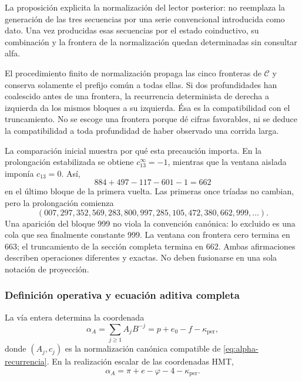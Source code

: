 La proposición explicita la normalización del lector posterior: no
reemplaza la generación de las tres secuencias por una serie convencional
introducida como dato. Una vez producidas esas secuencias por el estado
coinductivo, su combinación y la frontera de la normalización quedan
determinadas sin consultar alfa.

El procedimiento finito de normalización propaga las cinco
fronteras de \(\mathcal C\) y conserva solamente el prefijo común a
todas ellas. Si dos profundidades han coalescido antes de una frontera,
la recurrencia determinista de derecha a izquierda da los mismos bloques
a su izquierda. Ésa es la compatibilidad con el truncamiento. No se
escoge una frontera porque dé cifras favorables, ni se deduce la
compatibilidad a toda profundidad de haber observado una corrida larga.

La comparación inicial muestra por qué esta precaución importa. En la
prolongación estabilizada se obtiene \(c_{13}^{\infty}=-1\), mientras
que la ventana aislada imponía \(c_{13}=0\). Así,
\[
 884+497-117-601-1=662
\]
en el último bloque de la primera vuelta. Las primeras once tríadas no
cambian, pero la prolongación comienza
\[
 (007,297,352,569,283,800,997,285,105,472,380,662,999,\ldots).
\]
Una aparición del bloque 999 no viola la convención canónica: lo
excluido es una cola que sea finalmente constante 999. La ventana con
frontera cero termina en 663; el truncamiento de la sección completa
termina en 662. Ambas afirmaciones describen operaciones diferentes y
exactas. No deben fusionarse en una sola notación de proyección.

\subsubsection{Definición operativa y ecuación aditiva completa}
\label{subsec:alpha-definicion}

\begin{definition}
\label{def:alpha-operativa}
La vía entera determina la coordenada
\begin{equation}
 \alpha_A=\sum_{j\geq1}A_jB^{-j}
 =p+e_0-f-\kappa_{\mathrm{per}},
 \label{eq:alpha-via-a}
\end{equation}
donde \((A_j,c_j)\) es la normalización canónica compatible de
\eqref{eq:alpha-recurrencia}. En la realización escalar de las
coordenadas HMT,
\begin{equation}
 \boxed{\alpha_A=
 \pi+e-\varphi
 -4-\kappa_{\mathrm{per}}.}
 \label{eq:alpha-identidad-completa}
\end{equation}
\end{definition}


